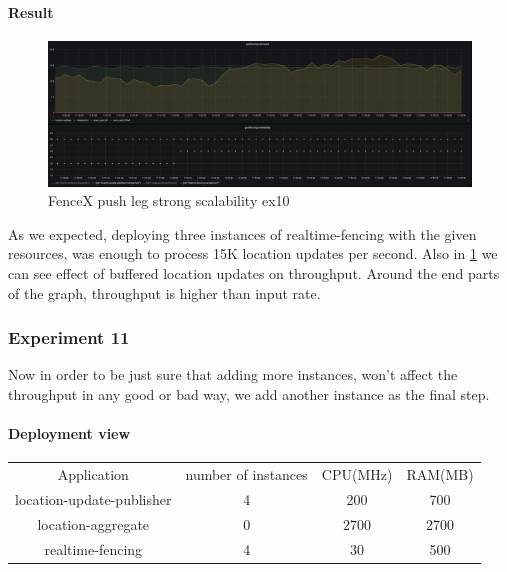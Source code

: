 \documentclass[a4]{report}
\begin{document}
    \paragraph{Result}
    \begin{figure}[ht]
        \caption{FenceX push leg strong scalability ex10}
        \label{fig:ex10}
        \includegraphics[scale=0.4]{images/evaluation/ex10-benchmarking-ongoing-2per4sec.png}
    \end{figure}
    As we expected, deploying three instances of realtime-fencing with the given resources, was enough to process 15K
    location updates per second.
    Also in \ref{fig:ex10} we can see effect of buffered location updates on throughput.
    Around the end parts of the graph, throughput is higher than input rate.

    \subsubsection{Experiment 11}
    Now in order to be just sure that adding more instances, won't affect the throughput in any good or bad way, we
    add another instance as the final step.
    \paragraph{Deployment view}
    \begin{center}
        \begin{tabular}{ c c c c }
            Application               &  number of instances     & CPU(MHz)  & RAM(MB)    \\
            location-update-publisher &          4               & 200       &   700      \\
            location-aggregate        &          0               & 2700      &   2700     \\
            realtime-fencing          &          4               & 30       &   500       \\
        \end{tabular}
    \end{center}
\end{document}

